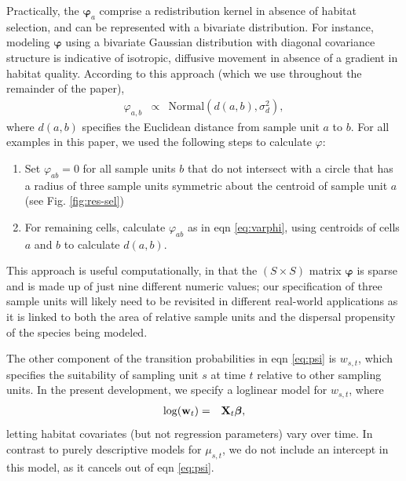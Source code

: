 \documentclass[times,mee,doublespace,]{besauth2}
\begin{document}
Practically, the $\boldsymbol{\varphi}_a$ comprise a redistribution kernel in absence of habitat selection, and can be represented with a bivariate distribution.  For instance, modeling $\boldsymbol{\varphi}$ using a bivariate Gaussian distribution with diagonal covariance structure is indicative of isotropic, diffusive movement in absence of a gradient in habitat quality.  According to this approach (which we use throughout the remainder of the paper),
\begin{eqnarray}
  \varphi_{a,b} & \propto & \text{Normal}(d(a,b),\sigma_d^2), \label{eq:varphi}
\end{eqnarray}
where $d(a,b)$ specifies the Euclidean distance from sample unit $a$ to $b$. For all examples in this paper, we used the following steps to calculate $\varphi$:
\begin{enumerate}
  \item Set $\varphi_{ab}=0$ for all sample units $b$ that do not intersect with a circle that has a radius of three sample units symmetric about the centroid of sample unit $a$ (see Fig. \ref{fig:res-sel})
  \item For remaining cells, calculate $\varphi_{ab}$ as in eqn \ref{eq:varphi}, using centroids of cells $a$ and $b$ to calculate $d(a,b)$.
\end{enumerate}
This approach is useful computationally, in that the $(S \times S)$ matrix $\boldsymbol{\varphi}$ is sparse and is made up of just nine different numeric values; our specification of three sample units will likely need to be revisited in different real-world applications as it is linked to both the area of relative sample units and the dispersal propensity of the species being modeled.

The other component of the transition probabilities in eqn \ref{eq:psi} is $w_{s,t}$, which specifies the suitability of sampling unit $s$ at time $t$ relative to other sampling units.  In the present development, we specify a loglinear model for $w_{s,t}$, where
\begin{eqnarray*}
  \log({\bf w}_t) & = & {\bf X}_t \boldsymbol{\beta}, %
\end{eqnarray*}
letting habitat covariates (but not regression parameters) vary over time.  In contrast to purely descriptive models for $\mu_{s,t}$, we do not include an intercept in this model, as it cancels out of eqn \ref{eq:psi}.
\end{document}
